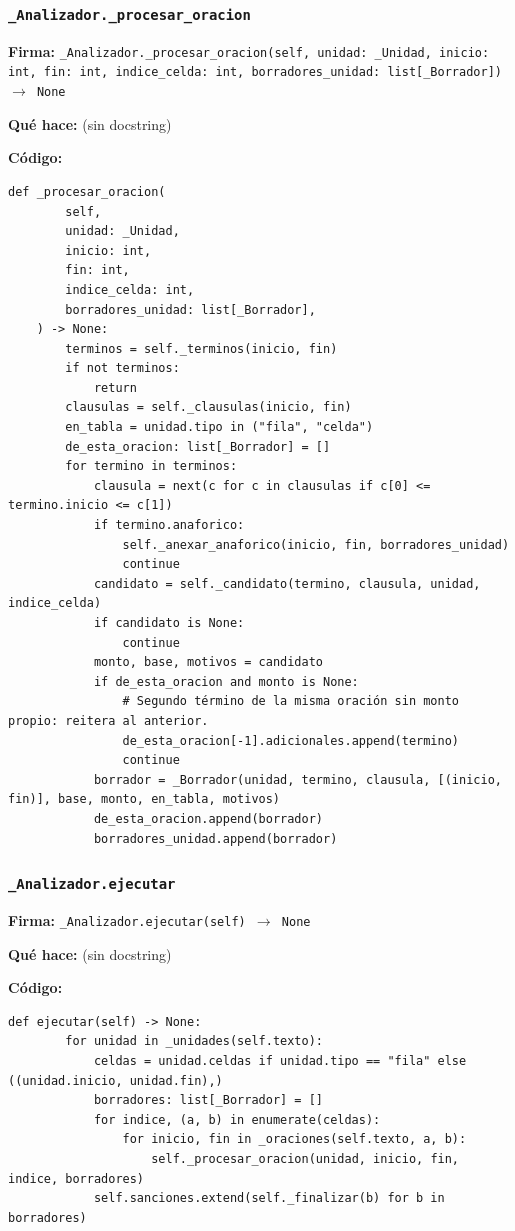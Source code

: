 \documentclass[11pt,a4paper]{article}
\begin{document}
\subsubsection*{\texttt{\_Analizador.\_procesar\_oracion}}
\textbf{Firma:} \texttt{\_Analizador.\_procesar\_oracion(self, unidad: \_Unidad, inicio: int, fin: int, indice\_celda: int, borradores\_unidad: list[\_Borrador]) $\rightarrow$ None}

\textbf{Qué hace:} (sin docstring)

\textbf{Código:}
\begin{lstlisting}
def _procesar_oracion(
        self,
        unidad: _Unidad,
        inicio: int,
        fin: int,
        indice_celda: int,
        borradores_unidad: list[_Borrador],
    ) -> None:
        terminos = self._terminos(inicio, fin)
        if not terminos:
            return
        clausulas = self._clausulas(inicio, fin)
        en_tabla = unidad.tipo in ("fila", "celda")
        de_esta_oracion: list[_Borrador] = []
        for termino in terminos:
            clausula = next(c for c in clausulas if c[0] <= termino.inicio <= c[1])
            if termino.anaforico:
                self._anexar_anaforico(inicio, fin, borradores_unidad)
                continue
            candidato = self._candidato(termino, clausula, unidad, indice_celda)
            if candidato is None:
                continue
            monto, base, motivos = candidato
            if de_esta_oracion and monto is None:
                # Segundo término de la misma oración sin monto propio: reitera al anterior.
                de_esta_oracion[-1].adicionales.append(termino)
                continue
            borrador = _Borrador(unidad, termino, clausula, [(inicio, fin)], base, monto, en_tabla, motivos)
            de_esta_oracion.append(borrador)
            borradores_unidad.append(borrador)
\end{lstlisting}

\subsubsection*{\texttt{\_Analizador.ejecutar}}
\textbf{Firma:} \texttt{\_Analizador.ejecutar(self) $\rightarrow$ None}

\textbf{Qué hace:} (sin docstring)

\textbf{Código:}
\begin{lstlisting}
def ejecutar(self) -> None:
        for unidad in _unidades(self.texto):
            celdas = unidad.celdas if unidad.tipo == "fila" else ((unidad.inicio, unidad.fin),)
            borradores: list[_Borrador] = []
            for indice, (a, b) in enumerate(celdas):
                for inicio, fin in _oraciones(self.texto, a, b):
                    self._procesar_oracion(unidad, inicio, fin, indice, borradores)
            self.sanciones.extend(self._finalizar(b) for b in borradores)
\end{lstlisting}
\end{document}
